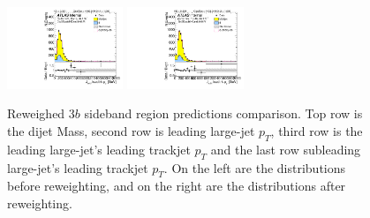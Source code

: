 \begin{figure}[htbp!]
\begin{center}
\includegraphics[width=0.31\textwidth,angle=-90]{figures/boosted/Prereweight/Moriond_ThreeTag_Sideband_sublHCand_trk0_Pt.pdf}
\includegraphics[width=0.31\textwidth,angle=-90]{figures/boosted/Sideband/b77_ThreeTag_Sideband_sublHCand_trk0_Pt.pdf}\\
\caption{Reweighed $3b$ sideband region predictions comparison. Top row is the dijet Mass, second row is leading large-\R jet $p_{T}$, third row is the leading large-\R jet's leading trackjet $p_T$ and the last row subleading large-\R jet's leading trackjet $p_T$. On the left are the distributions before reweighting, and on the right are the distributions after reweighting.}
\label{fig:rw-3b-comp-sb}
\end{center}
\end{figure}


